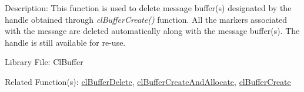 \begin{Desc}
\item[Description:]This function is used to delete message buffer(s) designated by the handle obtained through \textit{clBufferCreate()} function. All 
the markers associated with the message are deleted automatically along with the message buffer(s). The handle is still available for re-use.\end{Desc}
\begin{Desc}
\item[Library File:]Cl\-Buffer\end{Desc}
\begin{Desc}
\item[Related Function(s):]\hyperlink{pagebuf105}{cl\-Buffer\-Delete}, \hyperlink{pagebuf104}{cl\-Buffer\-Create\-And\-Allocate},
\hyperlink{pagebuf103}{cl\-Buffer\-Create} \end{Desc}


\newpage

